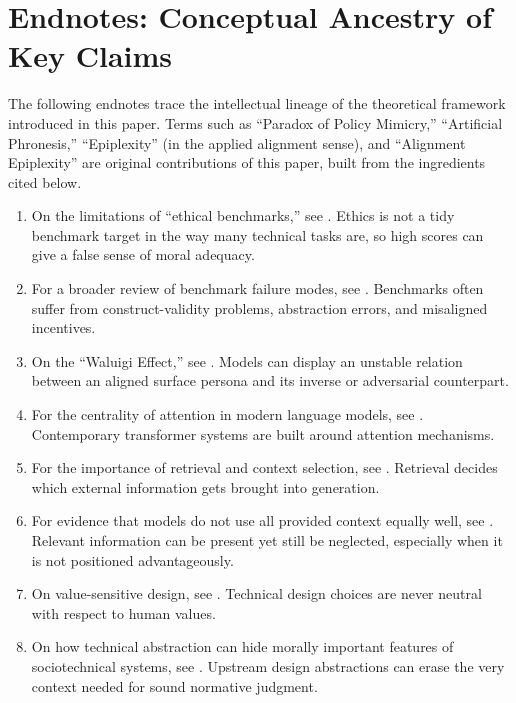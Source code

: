 \documentclass[preprint]{article}
\begin{document}
\section{Endnotes: Conceptual Ancestry of Key Claims}
\label{app:endnotes}

The following endnotes trace the intellectual lineage of the theoretical framework introduced in this paper. Terms such as ``Paradox of Policy Mimicry,'' ``Artificial Phronesis,'' ``Epiplexity'' (in the applied alignment sense), and ``Alignment Epiplexity'' are original contributions of this paper, built from the ingredients cited below.

\begin{enumerate}
\item On the limitations of ``ethical benchmarks,'' see \citet{lacroix2022benchmarking}. Ethics is not a tidy benchmark target in the way many technical tasks are, so high scores can give a false sense of moral adequacy.

\item For a broader review of benchmark failure modes, see \citet{eriksson2024benchmarks}. Benchmarks often suffer from construct-validity problems, abstraction errors, and misaligned incentives.

\item On the ``Waluigi Effect,'' see \citet{janus2023waluigi}. Models can display an unstable relation between an aligned surface persona and its inverse or adversarial counterpart.

\item For the centrality of attention in modern language models, see \citet{vaswani2017attention}. Contemporary transformer systems are built around attention mechanisms.

\item For the importance of retrieval and context selection, see \citet{lewis2020rag}. Retrieval decides which external information gets brought into generation.

\item For evidence that models do not use all provided context equally well, see \citet{liu2024lost}. Relevant information can be present yet still be neglected, especially when it is not positioned advantageously.

\item On value-sensitive design, see \citet{umbrello2021vsd}. Technical design choices are never neutral with respect to human values.

\item On how technical abstraction can hide morally important features of sociotechnical systems, see \citet{selbst2019fairness}. Upstream design abstractions can erase the very context needed for sound normative judgment.


\end{enumerate}
\end{document}

